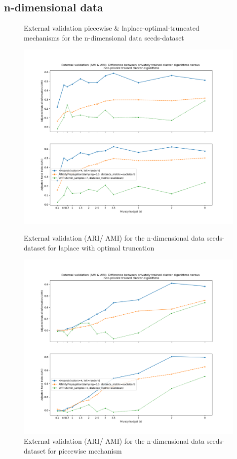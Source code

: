 \subsection{n-dimensional data}
\begin{figure}[H]
    \caption{External validation piecewise \& laplace-optimal-truncated mechanisms for the n-dimensional data seeds-dataset}
    \centering
    \begin{minipage}[c]{0.49\textwidth}
        \includegraphics[width=1\textwidth]{Results/nd-laplace-optimal-truncated/seeds-dataset/ami-and-ari.png}
        \caption{External validation (ARI/ AMI) for the n-dimensional data seeds-dataset for laplace with optimal truncation}
        \label{fig:external-validation-seeds-dataset_comparison_nd-laplace}
    \end{minipage}
    \begin{minipage}[c]{0.49\textwidth}
        \includegraphics[width=1\textwidth]{Results/nd-piecewise/seeds-dataset/ami-and-ari.png}
        \caption{External validation (ARI/ AMI) for the n-dimensional data seeds-dataset for piecewise mechanism}
        \label{fig:external-validation-seeds-dataset_comparison_nd-piecewise}
    \end{minipage}
\end{figure}
